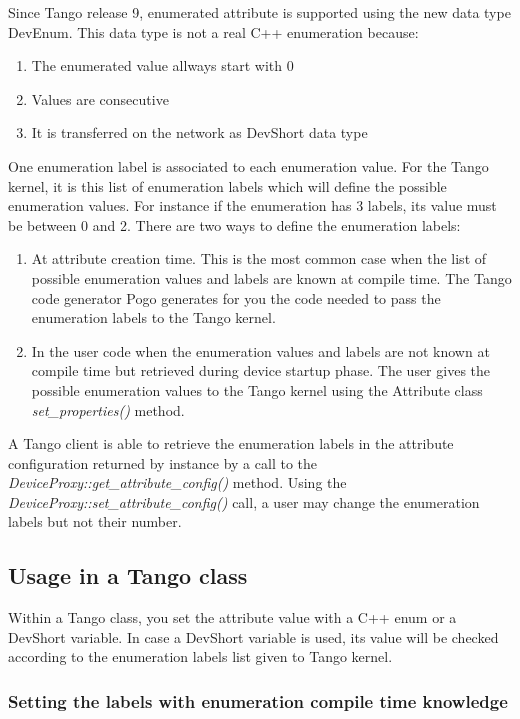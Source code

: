 Since Tango release 9, enumerated attribute is supported using the
new data type DevEnum. This data type is not a real
C++ enumeration because:
\begin{enumerate}
\item The enumerated value allways start with 0
\item Values are consecutive
\item It is transferred on the network as DevShort data type
\end{enumerate}
One enumeration label is associated to each enumeration value. For
the Tango kernel, it is this list of enumeration labels which will
define the possible enumeration values. For instance if the enumeration
has 3 labels, its value must be between 0 and 2. There are two ways
to define the enumeration labels:
\begin{enumerate}
\item At attribute creation time. This is the most common case when the
list of possible enumeration values and labels are known at compile
time. The Tango code generator Pogo generates for you the code needed
to pass the enumeration labels to the Tango kernel.
\item In the user code when the enumeration values and labels are not known
at compile time but retrieved during device startup phase. The user
gives the possible enumeration values to the Tango kernel using the
Attribute class \emph{set\_properties()} method.
\end{enumerate}
A Tango client is able to retrieve the enumeration labels in the attribute
configuration returned by instance by a call to the \emph{DeviceProxy::get\_attribute\_config()}
method. Using the \emph{DeviceProxy::set\_attribute\_config()} call,
a user may change the enumeration labels but not their number.


\subsection{Usage in a Tango class}

Within a Tango class, you set the attribute value with a C++ enum
or a DevShort variable. In case a DevShort variable is used, its value
will be checked according to the enumeration labels list given to
Tango kernel.


\subsubsection{Setting the labels with enumeration compile time knowledge}

